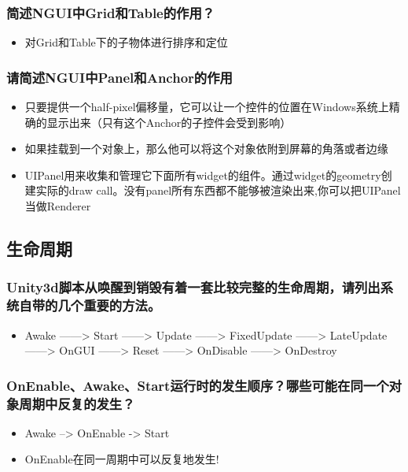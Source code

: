 \documentclass[9pt, b5paper]{article}
\begin{document}
\subsubsection{简述NGUI中Grid和Table的作用？}
\label{sec:org1dd9ee8}
\begin{itemize}
\item 对Grid和Table下的子物体进行排序和定位
\end{itemize}
\subsubsection{请简述NGUI中Panel和Anchor的作用}
\label{sec:org72fa41c}
\begin{itemize}
\item 只要提供一个half-pixel偏移量，它可以让一个控件的位置在Windows系统上精确的显示出来（只有这个Anchor的子控件会受到影响）
\item 如果挂载到一个对象上，那么他可以将这个对象依附到屏幕的角落或者边缘
\item UIPanel用来收集和管理它下面所有widget的组件。通过widget的geometry创建实际的draw call。没有panel所有东西都不能够被渲染出来,你可以把UIPanel当做Renderer
\end{itemize}


\subsection{生命周期}
\label{sec:orgea5fcc7}
\subsubsection{Unity3d脚本从唤醒到销毁有着一套比较完整的生命周期，请列出系统自带的几个重要的方法。}
\label{sec:org664f808}
\begin{itemize}
\item Awake ——> Start ——> Update ——> FixedUpdate ——> LateUpdate ——> OnGUI ——> Reset ——> OnDisable ——> OnDestroy
\end{itemize}
\subsubsection{OnEnable、Awake、Start运行时的发生顺序？哪些可能在同一个对象周期中反复的发生？}
\label{sec:org07565cc}
\begin{itemize}
\item Awake –> OnEnable -> Start
\item OnEnable在同一周期中可以反复地发生!
\end{itemize}
\end{document}
